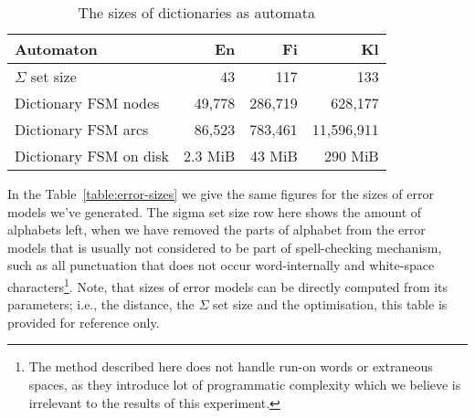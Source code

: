 \documentclass[free]{flammie}
\begin{document}
\begin{table}[h]
\begin{center}
\begin{scriptsize}
\begin{tabular}{|l|rrr|}
\hline
\bf Automaton & \bf En & \bf Fi & \bf Kl  \\ 
\hline
$\Sigma$ set size &
 43& 117& 133
\\
Dictionary FSM nodes &
 49,778& 286,719& 628,177
\\
Dictionary FSM arcs &
 86,523& 783,461& 11,596,911
\\
Dictionary FSM on disk & 
2.3 MiB &
43 MiB &
290 MiB
\\
\hline
\end{tabular}
\end{scriptsize}
\end{center}
\caption{\label{table:dictionary-sizes}
The sizes of dictionaries as automata}
\end{table}

In the Table~\ref{table:error-sizes} we give the same figures for the
sizes of error models we've generated. The sigma set size row here shows the
amount of alphabets left, when we have removed the parts of alphabet from the
error models that is usually not considered to be part of spell-checking
mechanism, such as all punctuation that does not occur word-internally and
white-space characters\footnote{The method described here does not handle
run-on words or extraneous spaces, as they introduce lot of programmatic
complexity which we believe is irrelevant to the results of this experiment.}.
Note, that sizes of error models can be directly computed from its parameters;
i.e., the distance, the $\Sigma$ set size and the optimisation, this table
is provided for reference only.
\end{document}
